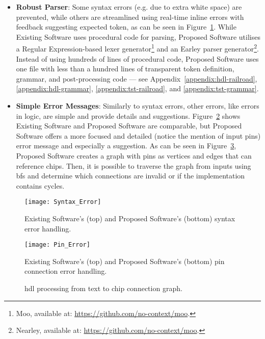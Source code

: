 \begin{itemize}
    \item \textbf{Robust Parser}: Some syntax errors (e.g. due to extra white space) are prevented, while others are streamlined using real-time inline errors with feedback suggesting expected token, as can be seen in Figure~\ref{fig:design-syntax-errors}. While Existing Software uses procedural code for parsing, Proposed Software utilises a Regular Expression-based lexer generator\footnote{Moo, available at: \url{https://github.com/no-context/moo}.} and an Earley parser generator\footnote{Nearley, available at: \url{https://github.com/no-context/moo}.}. Instead of using hundreds of lines of procedural code, Proposed Software uses one file with less than a hundred lines of transparent token definition, grammar, and post-processing code --- see Appendix~\ref{appendix:hdl-railroad}, \ref{appendix:hdl-grammar}, \ref{appendix:tst-railroad}, and \ref{appendix:tst-grammar}.
    \item \textbf{Simple Error Messages}: Similarly to syntax errors, other errors, like errors in logic, are simple and provide details and suggestions. Figure~\ref{fig:design-pin-error} shows Existing Software and Proposed Software are comparable, but Proposed Software offers a more focused and detailed (notice the mention of input pins) error message and especially a suggestion. As can be seen in Figure~\ref{fig:design-text-ast-graph}, Proposed Software creates a graph with pins as vertices and edges that can reference chips. Then, it is possible to traverse the graph from inputs using \gls{bfs} and determine which connections are invalid or if the implementation contains cycles.
\end{itemize}

\begin{figure}[H]
    \centering
    \texttt{[image: Syntax\_Error]}
    \caption{Existing Software's (top) and Proposed Software's (bottom) syntax error handling.}
    \label{fig:design-syntax-errors}
\end{figure}

\begin{figure}[H]
    \centering
    \texttt{[image: Pin\_Error]}
    \caption{Existing Software's (top) and Proposed Software's (bottom) pin connection error handling.}
    \label{fig:design-pin-error}
\end{figure}

\begin{figure}[H]
    \centering
    
    \caption{\gls{hdl} processing from text to chip connection graph.}
    \label{fig:design-text-ast-graph}
\end{figure}

